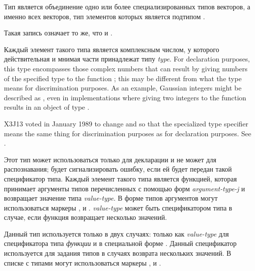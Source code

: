 \begin{flushdesc}
Тип  является объединение одно или более специализированных типов
векторов, а именно всех векторов, тип элементов которых является подтипом .

\item[\cd{(simple-vector \emph{size})}]
  Такая запись означает то же, что и .

\item[\cd{(complex \emph{type})}]
  Каждый элемент такого типа является комплексным числом, у которого
  действительная и мнимая части принадлежат типу \emph{type}.
  For declaration purposes, this type encompasses those complex numbers
  that can result by giving numbers of the specified type
  to the function ; this may be different
  from what the type means for discrimination purposes.
  As an example, Gaussian integers might be
  described as , even in implementations
  where giving two integers to the function  results
  in an object of type .

\begin{new}
X3J13 voted in January 1989
to change  and 
so that the specialized 
type specifier means the same thing for discrimination purposes
as for declaration purposes.
See .
\end{new}


\item[\cd{(function (\emph{argument-type-1} \emph{argument-type-2} ...) \emph{value-type})}]
  \relax Этот тип может использоваться только для декларации и не может для
  распознавания;  будет сигнализировать ошибку, если ей будет передан
  такой спецификатор типа. Каждый элемент такого типа является функцией, которая
  принимает аргументы типов перечисленных с помощью форм \emph{argument-type-j}
  и возвращает значение типа \emph{value-type}. В форме типов аргументов могут
  использоваться маркеры ,  и
  . \emph{value-type} может быть спецификатором типа  в
  случае, если функция возвращает несколько значений.

\item[\cd{(values \emph{value-type-1} \emph{value-type-2} ...)}]
  Данный тип используется только в двух случаях: только как \emph{value-type}
  для спецификатора типа \emph{функции} и в специальной форме . Данный
  спецификатор используется для задания типов в случаях возврата нескольких
  значений.
  В списке с типами могут использоваться маркеры ,  и
  .
\end{flushdesc}

